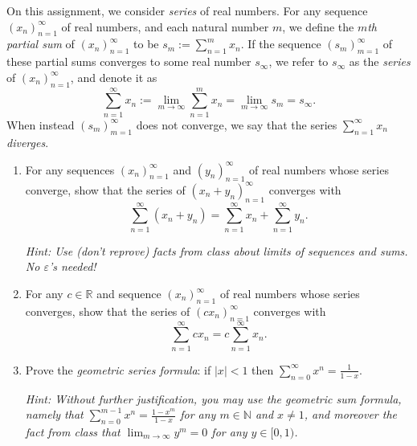 \documentclass[12 pt,letterpaper]{article}
\newcommand{\bbN}{\mathbb{N}}
\newcommand{\bbR}{\mathbb{R}}
\newcommand{\abs}[1]{|{#1}|}
\begin{document}
\noindent
On this assignment, we consider \textit{series} of real numbers.
For any sequence $(x_n)_{n=1}^{\infty}$ of real numbers,
and each natural number $m$,
we define the \textit{$m$th partial sum} of $(x_n)_{n=1}^{\infty}$ to be
$s_m:=\sum_{n=1}^{m}x_n$.
If the sequence $(s_m)_{m=1}^{\infty}$ of these partial sums converges to some real number $s_\infty$,
we refer to $s_\infty$ as the \textit{series} of $(x_n)_{n=1}^{\infty}$,
and denote it as
\begin{equation*}
\sum_{n=1}^{\infty}x_n
:=\lim_{m\rightarrow\infty}\sum_{n=1}^{m}x_n
=\lim_{m\rightarrow\infty}s_m
=s_\infty.
\end{equation*}
When instead $(s_m)_{m=1}^{\infty}$ does not converge,
we say that the series $\displaystyle\sum_{n=1}^{\infty}x_n$ \textit{diverges}.

\begin{enumerate}
\item
For any sequences $(x_n)_{n=1}^{\infty}$ and $(y_n)_{n=1}^{\infty}$ of real numbers whose series converge, show that the series of $(x_n+y_n)_{n=1}^{\infty}$ converges with
\begin{equation*}
\sum_{n=1}^{\infty}(x_n+y_n)
=\sum_{n=1}^{\infty}x_n+\sum_{n=1}^{\infty}y_n.
\end{equation*}

\textit{Hint: Use (don't reprove) facts from class about limits of sequences and sums.  No $\varepsilon$'s needed!}

\item
For any $c\in\bbR$ and sequence $(x_n)_{n=1}^{\infty}$ of real numbers whose series converges,
show that the series of $(cx_n)_{n=1}^{\infty}$ converges with
\begin{equation*}
\sum_{n=1}^{\infty}cx_n
=c\sum_{n=1}^{\infty}x_n.
\end{equation*}

\item
Prove the \textit{geometric series formula}: if $\abs{x}<1$ then
$\displaystyle\sum_{n=0}^{\infty}x^n=\frac{1}{1-x}$.

\textit{Hint:
Without further justification,
you may use the geometric sum formula,
namely that $\sum_{n=0}^{m-1}x^n=\frac{1-x^m}{1-x}$ for any $m\in\bbN$ and $x\neq 1$,
and moreover the fact from class that $\lim_{m\rightarrow\infty} y^m=0$ for any $y\in[0,1)$.}

\end{enumerate}
\end{document}
